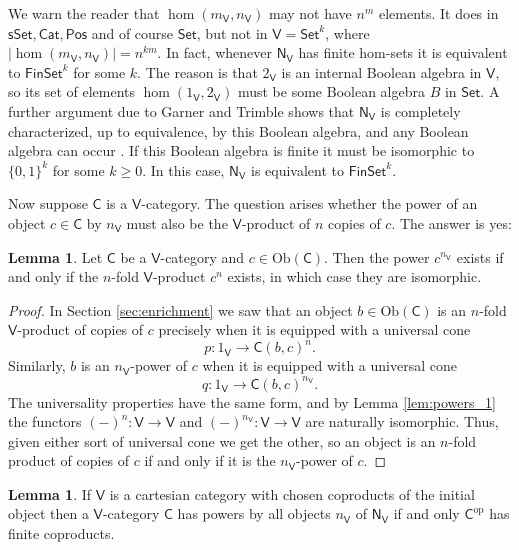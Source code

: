 \documentclass{amsart}
\theoremstyle{definition}
\newtheorem{lemma}[theorem]{Lemma}
\newcommand{\sSet}{\mathsf{sSet}}
\newcommand{\Set}{\mathsf{Set}}
\newcommand{\Cat}{\mathsf{Cat}}
\newcommand{\Pos}{\mathsf{Pos}}
\newcommand{\FinSet}{\mathsf{FinSet}}
\newcommand{\NN}{\mathsf{N}}
\newcommand{\V}{\mathsf{V}}
\newcommand{\C}{\mathsf{C}}
\newcommand{\op}{\mathrm{op}}
\newcommand{\Obj}{\mathrm{Ob}}
\newcommand{\maps}{\colon}
\begin{document}
We warn the reader that $\hom(m_\V,n_\V)$ may not have $n^m$ elements.  It does
in $\sSet,\Cat,\Pos$ and of course $\Set$, but not in $\V = \Set^k$, where
$|\hom(m_\V, n_\V)| = n^{km}$.    In fact, whenever $\NN_\V$ has finite hom-sets
it is equivalent to $\FinSet^k$ for some $k$.   The reason is that $2_\V$ is 
an internal Boolean algebra in $\V$, so its set of elements $\hom(1_\V,2_\V)$ 
must be some Boolean algebra $B$ in $\Set$.   A further argument due to Garner and Trimble shows that $\NN_\V$ is completely characterized, up to equivalence, by this Boolean algebra, and any Boolean algebra can occur \cite{nCafe}.   If this Boolean algebra is finite it must be isomorphic to $\{0,1\}^k$ for some $k \ge 0$.  In this case, $\NN_\V$ is equivalent to $\FinSet^k$.

Now suppose $\C$ is a $\V$-category.   The question arises whether the
power of an object $c \in \C$ by $n_\V$ must also be the $\V$-product of $n$ copies
of $c$.   The answer is yes:

\begin{lemma}
\label{lem:powers_2}
Let $\C$ be a $\V$-category and $c \in \Obj(\C)$.  Then the power $c^{n_\V}$ exists
if and only if the $n$-fold $\V$-product $c^n$ exists, in which case they are isomorphic.
\end{lemma}

\begin{proof}
In Section \ref{sec:enrichment} we saw that an object $b \in \Obj(\C)$ is an $n$-fold $\V$-product of copies of $c$ precisely when it is equipped with a universal cone 
\[        p \maps 1_\V \to \C(b,c)^n . \]
Similarly, $b$ is an $n_\V$-power of $c$ when it is equipped with a universal
cone 
\[       q \maps 1_\V \to \C(b,c)^{n_\V} .\]
The universality properties have the same form, and by Lemma \ref{lem:powers_1} the functors $(-)^n \maps \V\to \V$ and $(-)^{n_\V} \maps \V\to \V$ are naturally isomorphic.   Thus, given either sort of universal cone we get the other, so an object is an $n$-fold product of copies of $c$ if and only if it is the $n_\V$-power of $c$. 
\end{proof}

\iffalse
\begin{lemma}
If $\V$ is a cartesian category with chosen coproducts of the initial object then a
$\V$-category $\C$ has powers by all objects $n_\V$ of $\NN_\V$ if and only $\C^\op$
has finite coproducts.
\end{lemma}
\end{document}
